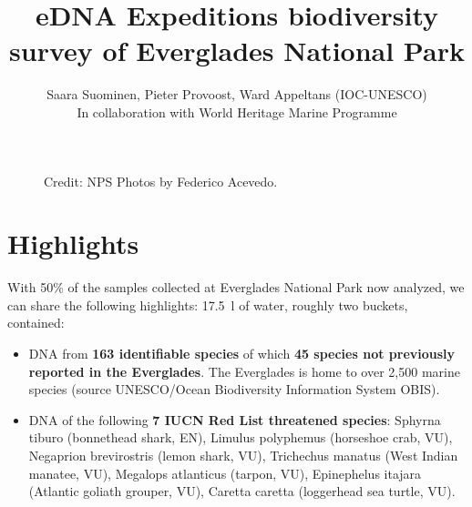 \documentclass[10pt]{article}
\date{}
\title{eDNA Expeditions biodiversity survey of Everglades National Park}
\author{Saara Suominen, Pieter Provoost, Ward Appeltans (IOC-UNESCO)\\In collaboration with World Heritage Marine Programme}
\begin{document}
\maketitle

\begin{figure}[h]
 	\centering
 	\caption*{Credit: NPS Photos by Federico Acevedo.}
\end{figure}

\section*{Highlights}

With 50\% of the samples collected at Everglades National Park now analyzed, we can share the following highlights: \SI{17.5}{\litre} of water, roughly two buckets, contained:

\begin{itemize}
\item DNA from \textbf{163 identifiable species} of which \textbf{45 species not previously reported in the Everglades}. The Everglades is home to over 2,500 marine species (source UNESCO/Ocean Biodiversity Information System OBIS).
\item DNA of the following \textbf{7 IUCN Red List threatened species}: Sphyrna tiburo (bonnethead shark, EN), Limulus polyphemus (horseshoe crab, VU), Negaprion brevirostris (lemon shark, VU), Trichechus manatus (West Indian manatee, VU), Megalops atlanticus (tarpon, VU), Epinephelus itajara (Atlantic goliath grouper, VU), Caretta caretta (loggerhead sea turtle, VU).
\end{itemize}
\end{document}
